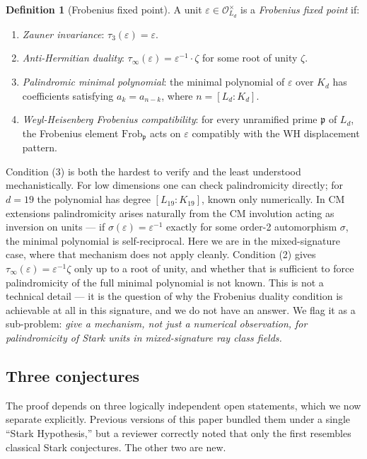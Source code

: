 \documentclass[12pt]{article}
\theoremstyle{plain}
\theoremstyle{definition}
\newtheorem{definitioninner}[theoreminner]{Definition}
\theoremstyle{remark}
\newenvironment{definition}{\begin{mdframed}[style=defstyle]\begin{definitioninner}}{\end{definitioninner}\end{mdframed}}
\newcommand{\OO}{\mathcal{O}}
\newcommand{\eps}{\varepsilon}
\begin{document}
\begin{definition}[Frobenius fixed point]
  \label{def:frobenius-fixed}
  A unit $\eps \in \OO_{L_d}^\times$ is a \emph{Frobenius fixed point} if:
  \begin{enumerate}
    \item \emph{Zauner invariance}: $\tau_3(\eps) = \eps$.
    \item \emph{Anti-Hermitian duality}: $\tau_\infty(\eps) = \eps^{-1} \cdot \zeta$ for some root of unity $\zeta$.
    \item \emph{Palindromic minimal polynomial}: the minimal polynomial of $\eps$ over $K_d$ has coefficients satisfying $a_k = a_{n-k}$, where $n = [L_d : K_d]$.
    \item \emph{Weyl-Heisenberg Frobenius compatibility}: for every unramified prime $\mathfrak{p}$ of $L_d$, the Frobenius element $\mathrm{Frob}_\mathfrak{p}$ acts on $\eps$ compatibly with the WH displacement pattern.
  \end{enumerate}
\end{definition}

Condition (3) is both the hardest to verify and the least understood mechanistically. For low dimensions one can check palindromicity directly; for $d = 19$ the polynomial has degree $[L_{19} : K_{19}]$, known only numerically. In CM extensions palindromicity arises naturally from the CM involution acting as inversion on units — if $\sigma(\eps) = \eps^{-1}$ exactly for some order-2 automorphism $\sigma$, the minimal polynomial is self-reciprocal. Here we are in the mixed-signature case, where that mechanism does not apply cleanly. Condition (2) gives $\tau_\infty(\eps) = \eps^{-1}\zeta$ only up to a root of unity, and whether that is sufficient to force palindromicity of the full minimal polynomial is not known. This is not a technical detail — it is the question of why the Frobenius duality condition is achievable at all in this signature, and we do not have an answer. We flag it as a sub-problem: \emph{give a mechanism, not just a numerical observation, for palindromicity of Stark units in mixed-signature ray class fields.}

\subsection{Three conjectures}
\label{subsec:hypotheses}

The proof depends on three logically independent open statements, which we now separate explicitly. Previous versions of this paper bundled them under a single ``Stark Hypothesis,'' but a reviewer correctly noted that only the first resembles classical Stark conjectures. The other two are new.
\end{document}
